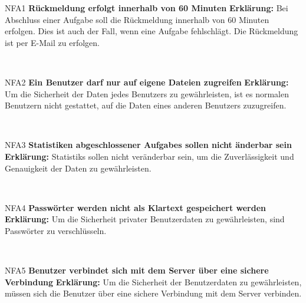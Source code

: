 \documentclass[a4paper,12pt]{article}
\begin{document}
\begin{itemize}[nosep]
	\leftskip=0.5cm
	\begin{minipage}[t]{\linewidth}
		\item[NFA1] \hspace{\parindent} \textbf{Rückmeldung erfolgt innerhalb von 60 Minuten}
		\subitem \textbf{Erklärung:} Bei Abschluss einer \gls{Aufgabe} soll die Rückmeldung innerhalb von 60 Minuten erfolgen. Dies ist auch der Fall, wenn eine \gls{Aufgabe} fehlschlägt. Die Rückmeldung ist per E-Mail zu erfolgen.
	
	\end{minipage}
	\newline
	\\
	
	\begin{minipage}[t]{\linewidth}
		\item[NFA2]\hspace{\parindent} \textbf{Ein \gls{Benutzer} darf nur auf eigene Dateien zugreifen}
		\subitem \textbf{Erklärung:} Um die Sicherheit der Daten jedes \gls{Benutzer}s zu gewährleisten, ist es normalen \gls{Benutzer}n nicht gestattet, auf die Daten eines anderen \gls{Benutzer}s zuzugreifen.
	
	\end{minipage}
	\newline
	\\
	
	\begin{minipage}[t]{\linewidth}
		\item[NFA3] \hspace{\parindent} \textbf{Statistiken abgeschlossener \glspl{Aufgabe} sollen nicht änderbar sein}
		\subitem \textbf{Erklärung:} \glspl{Statistik} sollen nicht veränderbar sein, um die Zuverlässigkeit und Genauigkeit der Daten zu gewährleisten.
	
	\end{minipage}
	\newline
	\\
	
	\begin{minipage}[t]{\linewidth}
		\item[NFA4]\hspace{\parindent} \textbf{Passwörter werden nicht als Klartext gespeichert werden}
		\subitem \textbf{Erklärung:} Um die Sicherheit privater \gls{Benutzer}daten zu gewährleisten, sind Passwörter zu verschlüsseln.
	
	\end{minipage}
	\newline
	\\
	
	\begin{minipage}[t]{\linewidth}
		\item[NFA5]\hspace{\parindent}  \textbf{Benutzer verbindet sich mit dem \gls{Server} über eine sichere Verbindung}
		\subitem \textbf{Erklärung:} Um die Sicherheit der \gls{Benutzer}daten zu gewährleisten, müssen sich die \gls{Benutzer} über eine sichere Verbindung mit dem \gls{Server} verbinden.
	
	\end{minipage}
\end{itemize}
\newpage
\end{document}
